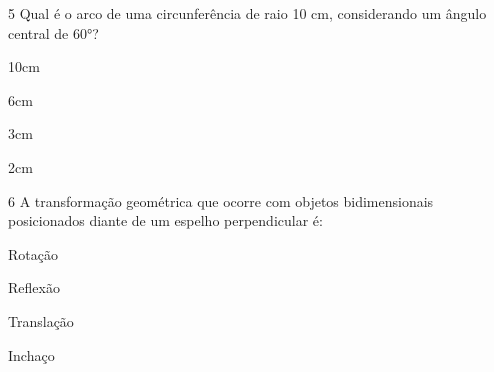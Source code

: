 \num{5} Qual é o arco de uma circunferência de raio 10 cm, considerando um
ângulo central de 60°?

\begin{escolha}
\item 10\pi cm
\item 6\pi cm
\item 3\pi cm
\item 2\pi cm
\end{escolha}




\num{6} A transformação geométrica que ocorre com objetos bidimensionais
posicionados diante de um espelho perpendicular é:

\begin{escolha}
\item Rotação
\item Reflexão
\item Translação
\item Inchaço
\end{escolha}



